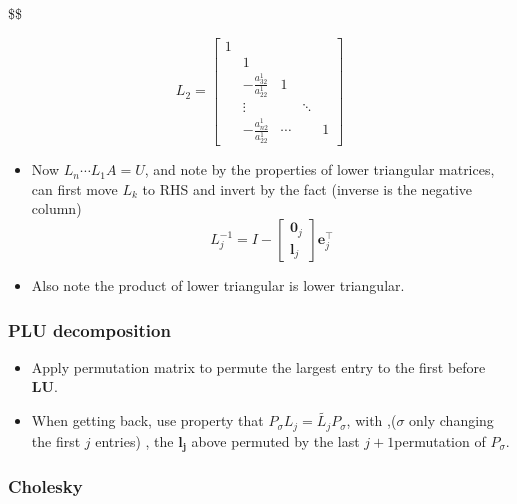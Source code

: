 \documentclass[
]{article}
\providecommand{\tightlist}{%
  \setlength{\itemsep}{0pt}\setlength{\parskip}{0pt}}
\begin{document}
\$\$

\[L_2 = \begin{bmatrix} 1 \\ 
 & 1 \\ 
& -\frac{a_{32}^1}{a_{22}^1} & 1 \\
& ⋮ & & \ddots \\
& -\frac{a_{n2}^1}{a_{22}^1} & \cdots && 1
\end{bmatrix}\]

\begin{itemize}
\tightlist
\item
  Now \(L_n \cdots L_1 A = U\), and note by the properties of lower
  triangular matrices, can first move \(L_k\) to RHS and invert by the
  fact (inverse is the negative column) \[
  L_j^{-1}  = I - \begin{bmatrix} 𝟎_j \\ 𝐥_j \end{bmatrix} 𝐞_j^⊤
  \]
\item
  Also note the product of lower triangular is lower triangular.
\end{itemize}

\hypertarget{plu-decomposition}{%
\subsubsection{\texorpdfstring{\textbf{PLU
decomposition}}{PLU decomposition}}\label{plu-decomposition}}

\begin{itemize}
\item
  Apply permutation matrix to permute the largest entry to the first
  before \textbf{LU}.
\item
  When getting back, use property that
  \(P_{\sigma} L_j = \tilde{L_j} P_{\sigma}\), with ,(\(\sigma\) only
  changing the first \(j\) entries) , the \(\mathbf{l_j}\) above
  permuted by the last \(j+1\)permutation of \(P_{\sigma}\).
\end{itemize}

\hypertarget{cholesky}{%
\subsubsection{\texorpdfstring{\textbf{Cholesky}}{Cholesky}}\label{cholesky}}
\end{document}

